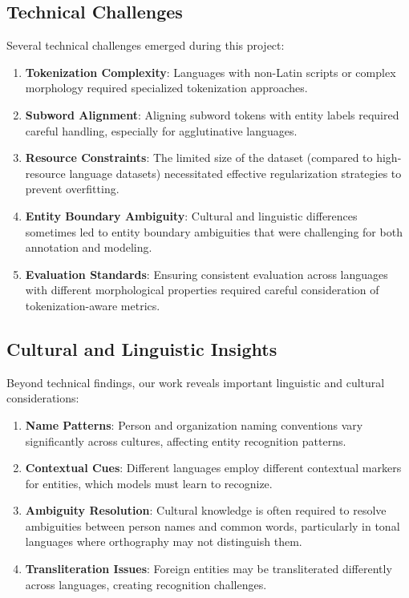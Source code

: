 \documentclass[
]{article}
\begin{document}
\subsection{Technical Challenges}\label{technical-challenges}

Several technical challenges emerged during this project:

\begin{enumerate}
\def\labelenumi{\arabic{enumi}.}
\item
  \textbf{Tokenization Complexity}: Languages with non-Latin scripts or
  complex morphology required specialized tokenization approaches.
\item
  \textbf{Subword Alignment}: Aligning subword tokens with entity labels
  required careful handling, especially for agglutinative languages.
\item
  \textbf{Resource Constraints}: The limited size of the dataset
  (compared to high-resource language datasets) necessitated effective
  regularization strategies to prevent overfitting.
\item
  \textbf{Entity Boundary Ambiguity}: Cultural and linguistic
  differences sometimes led to entity boundary ambiguities that were
  challenging for both annotation and modeling.
\item
  \textbf{Evaluation Standards}: Ensuring consistent evaluation across
  languages with different morphological properties required careful
  consideration of tokenization-aware metrics.
\end{enumerate}

\subsection{Cultural and Linguistic
Insights}\label{cultural-and-linguistic-insights}

Beyond technical findings, our work reveals important linguistic and
cultural considerations:

\begin{enumerate}
\def\labelenumi{\arabic{enumi}.}
\item
  \textbf{Name Patterns}: Person and organization naming conventions
  vary significantly across cultures, affecting entity recognition
  patterns.
\item
  \textbf{Contextual Cues}: Different languages employ different
  contextual markers for entities, which models must learn to recognize.
\item
  \textbf{Ambiguity Resolution}: Cultural knowledge is often required to
  resolve ambiguities between person names and common words,
  particularly in tonal languages where orthography may not distinguish
  them.
\item
  \textbf{Transliteration Issues}: Foreign entities may be
  transliterated differently across languages, creating recognition
  challenges.
\end{enumerate}
\end{document}
